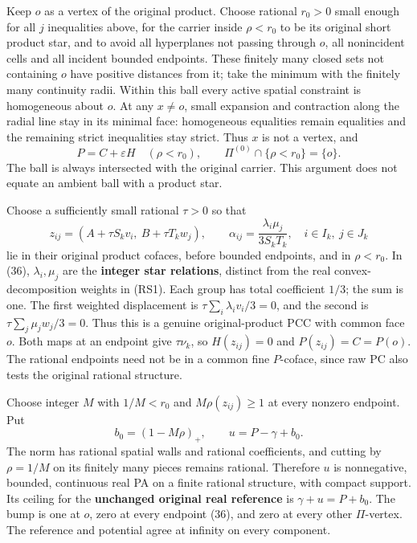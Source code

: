 \documentclass[
  11pt,
]{article}
\begin{document}
Keep \(o\) as a vertex of the original product. Choose rational
\(r_0>0\) small enough for all \(j\) inequalities above, for the carrier
inside \(\rho<r_0\) to be its original short product star, and to avoid
all hyperplanes not passing through \(o\), all nonincident cells and all
incident bounded endpoints. These finitely many closed sets not
containing \(o\) have positive distances from it; take the minimum with
the finitely many continuity radii. Within this ball every active
spatial constraint is homogeneous about \(o\). At any \(x\ne o\), small
expansion and contraction along the radial line stay in its minimal
face: homogeneous equalities remain equalities and the remaining strict
inequalities stay strict. Thus \(x\) is not a vertex, and \[
 P=C+\varepsilon H\quad(\rho<r_0),\qquad
                  \Pi^{(0)}\cap\{\rho<r_0\}=\{o\}.           \tag{35}
\] The ball is always intersected with the original carrier. This
argument does not equate an ambient ball with a product star.

Choose a sufficiently small rational \(\tau>0\) so that \[
 z_{ij}=(A+\tau S_kv_i,\ B+\tau T_kw_j),\qquad
 \alpha_{ij}=\frac{\lambda_i\mu_j}{3S_kT_k},
 \quad i\in I_k,\ j\in J_k                                  \tag{36}
\] lie in their original product cofaces, before bounded endpoints, and
in \(\rho<r_0\). In (36), \(\lambda_i,\mu_j\) are the \textbf{integer
star relations}, distinct from the real convex-decomposition weights in
(RS1). Each group has total coefficient \(1/3\); the sum is one. The
first weighted displacement is \(\tau\sum_i\lambda_iv_i/3=0\), and the
second is \(\tau\sum_j\mu_jw_j/3=0\). Thus this is a genuine
original-product PCC with common face \(o\). Both maps at an endpoint
give \(\tau\nu_k\), so \(H(z_{ij})=0\) and \(P(z_{ij})=C=P(o)\). The
rational endpoints need not be in a common fine \(P\)-coface, since raw
PC also tests the original rational structure.

Choose integer \(M\) with \(1/M<r_0\) and \(M\rho(z_{ij})\geq1\) at
every nonzero endpoint. Put \[
             b_0=(1-M\rho)_+,\qquad u=P-\gamma+b_0.           \tag{37}
\] The norm has rational spatial walls and rational coefficients, and
cutting by \(\rho=1/M\) on its finitely many pieces remains rational.
Therefore \(u\) is nonnegative, bounded, continuous real PA on a finite
rational structure, with compact support. Its ceiling for the
\textbf{unchanged original real reference} is \(\gamma+u=P+b_0\). The
bump is one at \(o\), zero at every endpoint (36), and zero at every
other \(\Pi\)-vertex. The reference and potential agree at infinity on
every component.
\end{document}
